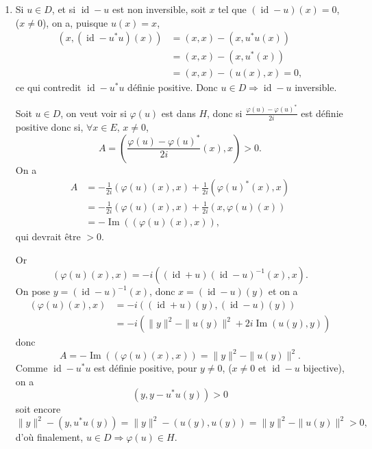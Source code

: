 \begin{enumerate}[label=\arabic*.,leftmargin=2.2em,itemsep=1.15em]
Mais $\operatorname{Ker}f^*=(\operatorname{Im}f^{**})^\perp=(\operatorname{Im}f)^\perp$ donc $f(t)\in(\operatorname{Im}f)^\perp\cap\operatorname{Im}f=\{0\}$, d'où $x=0$, et $f+f^*$ est injective. On est en dimension finie donc $f+f^*$ est inversible.

Si $f+f^*$ est inversible, soit $x\in\operatorname{Ker}f$ et $y=(f+f^*)^{-1}(x)$, on a
\[
(f+f^*)(y)=x=f(y)+f^*(y).
\]
On compose avec $f$, en utilisant $f^2=0$ et $x\in\operatorname{Ker}f$, il reste $f(f^*(y))=0$ donc $f^*(y)\in\operatorname{Ker}f=(\operatorname{Im}f^*)^\perp$ d'où $f^*(y)=0$.

Mais alors $x=f(y)\in\operatorname{Im}f$ : on a $\operatorname{Ker}f\subset\operatorname{Im}f$ d'où l'égalité puisque $\operatorname{Im}f\subset\operatorname{Ker}f$ était vraie, 

\item Si $u\in D$, et si $\operatorname{id}-u$ est non inversible, soit $x$ tel que $(\operatorname{id}-u)(x)=0$, ($x\ne0$), on a, puisque $u(x)=x$,
\[
\begin{aligned}
(x,(\operatorname{id}-u^*u)(x))
&=(x,x)-(x,u^*u(x))\\
&=(x,x)-(x,u^*(x))\\
&=(x,x)-(u(x),x)=0,
\end{aligned}
\]
ce qui contredit $\operatorname{id}-u^*u$ définie positive. Donc $u\in D\Rightarrow\operatorname{id}-u$ inversible.

Soit $u\in D$, on veut voir si $\varphi(u)$ est dans $H$, donc si $\frac{\varphi(u)-\varphi(u)^*}{2i}$ est définie positive donc si, $\forall x\in E$, $x\ne0$,
\[
A=\left(\frac{\varphi(u)-\varphi(u)^*}{2i}(x),x\right)>0.
\]
On a
\[
\begin{aligned}
A&=-\frac1{2i}(\varphi(u)(x),x)+\frac1{2i}(\varphi(u)^*(x),x)\\
&=-\frac1{2i}(\varphi(u)(x),x)+\frac1{2i}(x,\varphi(u)(x))\\
&=-\operatorname{Im}((\varphi(u)(x),x)),
\end{aligned}
\]
qui devrait être $>0$.

Or
\[
(\varphi(u)(x),x)=-i((\operatorname{id}+u)(\operatorname{id}-u)^{-1}(x),x).
\]
On pose $y=(\operatorname{id}-u)^{-1}(x)$, donc $x=(\operatorname{id}-u)(y)$ et on a
\[
\begin{aligned}
(\varphi(u)(x),x)
&=-i((\operatorname{id}+u)(y),(\operatorname{id}-u)(y))\\
&=-i(\|y\|^2-\|u(y)\|^2+2i\operatorname{Im}(u(y),y))
\end{aligned}
\]
donc
\[
A=-\operatorname{Im}((\varphi(u)(x),x))=\|y\|^2-\|u(y)\|^2.
\]
Comme $\operatorname{id}-u^*u$ est définie positive, pour $y\ne0$, ($x\ne0$ et $\operatorname{id}-u$ bijective), on a
\[
(y,y-u^*u(y))>0
\]
soit encore
\[
\|y\|^2-(y,u^*u(y))=\|y\|^2-(u(y),u(y))=\|y\|^2-\|u(y)\|^2>0,
\]
d'où finalement, $u\in D\Rightarrow\varphi(u)\in H$.


\end{enumerate}

